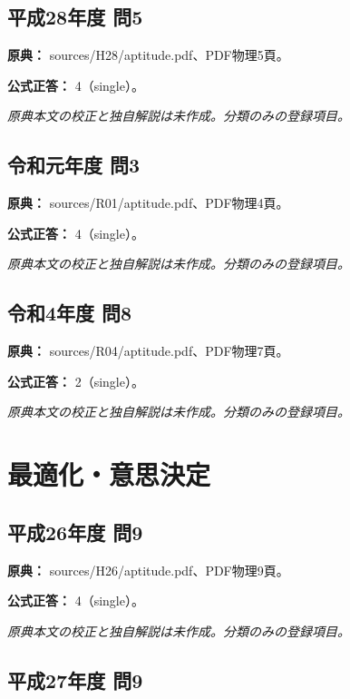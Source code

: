 \subsection{平成28年度 問5}
\label{q:h28-reg-apt-05}

\noindent\textbf{原典：} sources/H28/aptitude.pdf、PDF物理5頁。

\textbf{公式正答：} 4（single）。

\par\textit{原典本文の校正と独自解説は未作成。分類のみの登録項目。}

\subsection{令和元年度 問3}
\label{q:r01-reg-apt-03}

\noindent\textbf{原典：} sources/R01/aptitude.pdf、PDF物理4頁。

\textbf{公式正答：} 4（single）。

\par\textit{原典本文の校正と独自解説は未作成。分類のみの登録項目。}

\subsection{令和4年度 問8}
\label{q:r04-reg-apt-08}

\noindent\textbf{原典：} sources/R04/aptitude.pdf、PDF物理7頁。

\textbf{公式正答：} 2（single）。

\par\textit{原典本文の校正と独自解説は未作成。分類のみの登録項目。}

\section{最適化・意思決定}

\subsection{平成26年度 問9}
\label{q:h26-reg-apt-09}

\noindent\textbf{原典：} sources/H26/aptitude.pdf、PDF物理9頁。

\textbf{公式正答：} 4（single）。

\par\textit{原典本文の校正と独自解説は未作成。分類のみの登録項目。}

\subsection{平成27年度 問9}
\label{q:h27-reg-apt-09}


